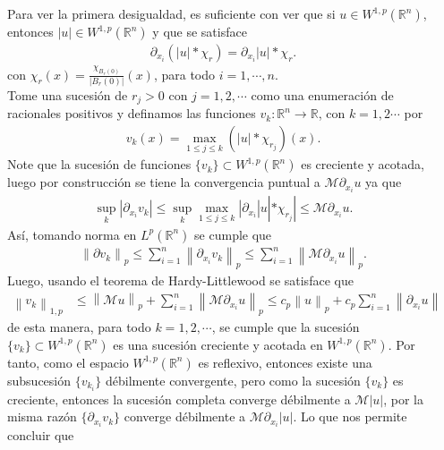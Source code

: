 \documentclass[final]{beamer}
\providecommand{\norm}[1]{\left\|#1\right\|}
\newlength{\sepwidth}
\newlength{\colwidth}
\newcommand{\separatorcolumn}{\begin{column}{\sepwidth}\end{column}}
\begin{document}
\begin{frame}[t]
\begin{columns}[t]
\separatorcolumn

\begin{column}{\colwidth}

  \begin{alertblock}{}
      Para ver la primera desigualdad, es suficiente con ver que si $u\in W^{1,p}(\mathbb{R}^{n})$, entonces $|u|\in W^{1,p}(\mathbb{R}^{n})$ y que se satisface
      \begin{align*}
        \partial_{x_i}\left( |u|*\chi_{r} \right)=\partial_{x_i}|u|*\chi_{r}.
      \end{align*}
      con $\chi_{r}(x)=\frac{\chi_{B_{r}(0)}}{|B_{r}(0)|}(x)$, para todo $i=1,\cdots,n$.\\
      Tome una sucesión de $r_{j}>0$ con $j=1,2,\cdots$ como una enumeración de racionales positivos y definamos las funciones $v_{k}:\mathbb{R}^{n}\to\mathbb{R}$, con $k=1,2\cdots$ por 
      \begin{align*}
        v_{k}(x)=\max_{1\leq j\leq k}\left( |u|*\chi_{r_{j}} \right)(x).
      \end{align*}
      Note que la sucesión de funciones $\{v_{k}\}\subset W^{1,p}(\mathbb{R}^{n})$ es creciente y acotada, luego por construcción se tiene la convergencia puntual a $\mathcal{M}\partial_{x_i}u$ ya que
      \begin{align*}
        \sup_{k}|\partial_{x_i}v_{k}|\leq\sup_{k}\max_{1\leq j\leq k}|\partial_{x_i}|u|*\chi_{r_{j}}|\leq \mathcal{M}\partial_{x_i}u.
      \end{align*}
      Así, tomando norma en $L^{p}(\mathbb{R}^{n})$ se cumple que
      \begin{align*}
        \norm{\partial v_{k}}_{p}\leq\sum_{i=1}^{n}\norm{\partial_{x_{i}}v_k}_{p}\leq\sum_{i=1}^{n}\norm{\mathcal{M}\partial_{x_i} u}_{p}.
      \end{align*}
      Luego, usando el teorema de Hardy-Littlewood se satisface que
      \begin{align*}
        \norm{v_k}_{1,p}&\leq \norm{\mathcal{M}u}_{p}+\sum_{i=1}^{n}\norm{\mathcal{M}\partial_{x_{i}}u}_{p}\leq c_p\norm{u}_{p}+c_{p}\sum_{i=1}^{n}\norm{\partial_{x_{i}}u}_{p}<\infty,
      \end{align*}
      de esta manera, para todo $k=1,2,\cdots$, se cumple que la sucesión $\{v_{k}\}\subset W^{1,p}(\mathbb{R}^{n})$ es una sucesión creciente y acotada en $W^{1,p}(\mathbb{R}^{n})$. Por tanto, como el espacio $W^{1,p}(\mathbb{R}^{n})$ es reflexivo, entonces existe una subsucesión $\{v_{k_{i}}\}$ débilmente convergente, pero como la sucesión $\{v_{k}\}$ es creciente, entonces la sucesión completa converge débilmente a $\mathcal{M}|u|$, por la misma razón $\{\partial_{x_{i}}v_{k}\}$ converge débilmente a $\mathcal{M}\partial_{x_i}|u|$. Lo que nos permite concluir que

\end{alertblock}
\end{column}
\end{columns}
\end{frame}
\end{document}
